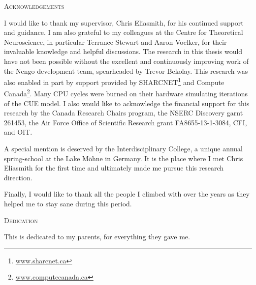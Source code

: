 \begin{center}\textsc{Acknowledgements}\end{center}
I would like to thank my supervisor, Chris Eliasmith, for his continued support and guidance.
I am also grateful to my colleagues at the Centre for Theoretical Neuroscience, in particular Terrance Stewart and Aaron Voelker, for their invaluable knowledge and helpful discussions.
The research in this thesis would have not been possible without the excellent and continuously improving work of the Nengo development team, spearheaded by Trevor Bekolay.
This research was also enabled in part by support provided by SHARCNET\footnote{\href{https://www.sharcnet.ca}{www.sharcnet.ca}} and Compute Canada\footnote{\href{https://www.computecanada.ca}{www.computecanada.ca}}.
Many CPU cycles were burned on their hardware simulating iterations of the CUE model.
I also would like to acknowledge the financial support for this research by the Canada Research Chairs program, the NSERC Discovery garnt 261453, the Air Force Office of Scientific Research grant FA8655-13-1-3084, CFI, and OIT\@.  %

A special mention is deserved by the Interdisciplinary College, a unique annual spring-school at the Lake Möhne in Germany.
It is the place where I met Chris Eliasmith for the first time and ultimately made me pursue this research direction.

Finally, I would like to thank all the people I climbed with over the years as they helped me to stay sane during this period.


\cleardoublepage


\begin{center}\textsc{Dedication}\end{center}

This is dedicated to my parents, for everything they gave me.

\cleardoublepage

\renewcommand\contentsname{Table of Contents}
\tableofcontents
\cleardoublepage

\listoftables
\cleardoublepage

\listoffigures
\cleardoublepage

\printglossaries
\cleardoublepage

\pagestyle{headings}
